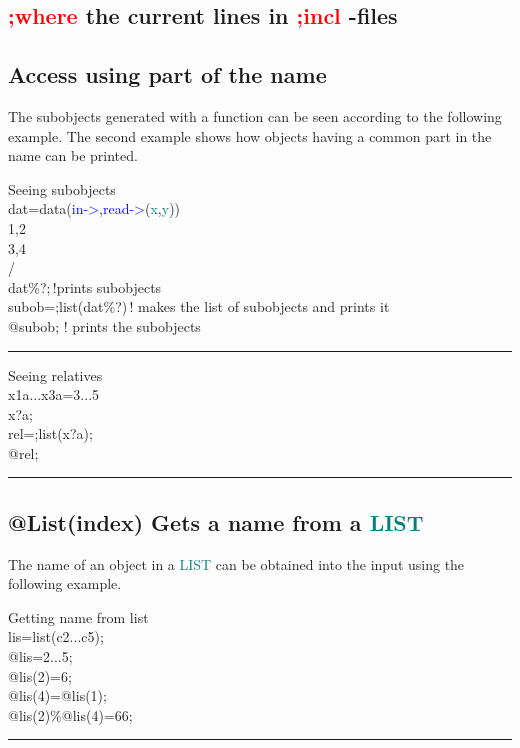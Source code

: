 \subsection{\textcolor{Red}{;where} the current lines in \textcolor{Red}{;incl} -files} 
\label{inpuwhere} 
\subsection{Access using part of the name} 
\label{inpusubobj} 
The subobjects generated with a function can be seen according 
to the following example. The second example shows how objects having a common part in the 
name can be printed. 
\singlespacing 
\begin{example}[subobjex]Seeing subobjects\\ 
\label{subobjex} 
\noindent dat=\textcolor{VioletRed}{data}(\textcolor{blue}{in->},\textcolor{blue}{read->}(\textcolor{teal}{x},\textcolor{teal}{y}))\\ 
1,2\\ 
3,4\\ 
/  \\ 
dat\%?;\,{\color{ForestGreen}!prints subobjects}\\ 
subob=;list(dat\%?)\,{\color{ForestGreen}! makes the list of subobjects and prints it}\\ 
@subob;\,\,{\color{ForestGreen}! prints the subobjects}\\ 
\end{example} 
\vspace{-7mm} \rule{5cm}{0.1pt} 
\onehalfspacing 
\singlespacing 
\begin{example}[relativesex]Seeing relatives\\ 
\label{relativesex} 
\noindent x1a...x3a=3...5\\ 
x?a;\\ 
rel=;list(x?a);\\ 
@rel;\\ 
\end{example} 
\vspace{-7mm} \rule{5cm}{0.1pt} 
\onehalfspacing 
\subsection{@List(index) Gets a name from a \textcolor{teal}{LIST}} 
\label{inpulistelem} 
The name of an object in a \textcolor{teal}{LIST} can be obtained into the input using the following example. 
\singlespacing 
\begin{example}[inpulistelem]Getting name from list\\ 
\label{inpulistelem} 
\noindent lis=\textcolor{VioletRed}{list}(c2...c5);\\ 
@lis=2...5;\\ 
@lis(2)=6;\\ 
@lis(4)=@lis(1);\\ 
@lis(2)\%@lis(4)=66;\\ 
\end{example} 
\vspace{-7mm} \rule{5cm}{0.1pt} 
\onehalfspacing 
